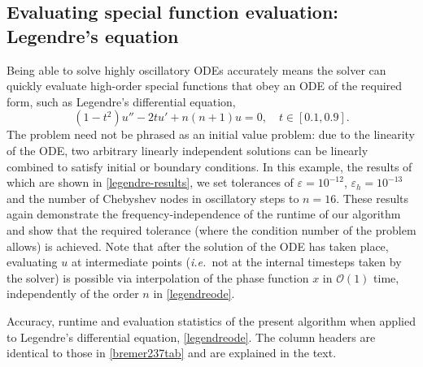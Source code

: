 \documentclass[10pt]{article}
\newcommand{\be}{\begin{equation}}
\newcommand{\ee}{\end{equation}}
\newcommand{\ie}{{\it i.e.\ }}
\newcommand{\bigO}{{\mathcal O}}
\begin{document}
\subsection{Evaluating special function evaluation: Legendre's equation}

Being able to solve highly oscillatory ODEs accurately means the solver can
quickly evaluate high-order special functions that obey an ODE of the required
form, such as Legendre's differential equation,
\be\label{legendreode}
(1-t^2)u'' - 2tu' + n(n+1)u = 0, \quad t \in [0.1, 0.9]. 
\ee
The problem need not be phrased as an initial value problem: due to the
linearity of the ODE, two arbitrary linearly independent solutions can be
linearly combined to satisfy initial or boundary conditions. In this example,
the results of which are shown in \cref{legendre-results}, we set tolerances of
$\varepsilon = 10^{-12}$, $\varepsilon_h = 10^{-13}$ and the number of
Chebyshev nodes in oscillatory steps to $n = 16$. 
These results again demonstrate the frequency-independence of the runtime of
our algorithm and show that the required tolerance (where the condition number
of the problem allows) is achieved. Note that after the solution of the ODE has
taken place, evaluating $u$ at intermediate points (\ie not at the internal
timesteps taken by the solver) is possible via interpolation of the phase
function $x$ in $\bigO(1)$ time, independently of the order $n$ in \cref{legendreode}.


\begin{table}
    \renewcommand{\arraystretch}{1.2}
    \resizebox{\textwidth}{!}{}
    \caption{Accuracy, runtime and evaluation statistics of the present algorithm when
    applied to Legendre's differential equation, \cref{legendreode}. The column
    headers are identical to those in \cref{bremer237tab} and are explained in
    the text. \label{legendre-results}}
\end{table}
\end{document}
